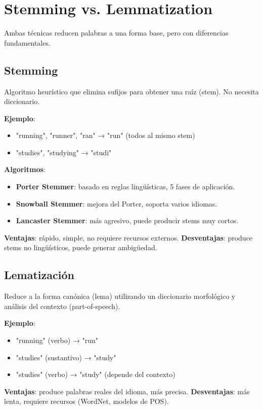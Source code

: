 \documentclass[12pt,a4paper,openany,oneside]{book}
\begin{document}
\section{Stemming vs. Lemmatization}

Ambas técnicas reducen palabras a una forma base, pero con diferencias fundamentales.

\subsection{Stemming}
Algoritmo heurístico que elimina sufijos para obtener una raíz (stem). No necesita diccionario.

\textbf{Ejemplo}:
\begin{itemize}
    \item "running", "runner", "ran" → "run" (todos al mismo stem)
    \item "studies", "studying" → "studi"
\end{itemize}

\textbf{Algoritmos}:
\begin{itemize}
    \item \textbf{Porter Stemmer}: basado en reglas lingüísticas, 5 fases de aplicación.
    \item \textbf{Snowball Stemmer}: mejora del Porter, soporta varios idiomas.
    \item \textbf{Lancaster Stemmer}: más agresivo, puede producir stems muy cortos.
\end{itemize}

\textbf{Ventajas}: rápido, simple, no requiere recursos externos.
\textbf{Desventajas}: produce stems no lingüísticos, puede generar ambigüedad.

\subsection{Lematización}
Reduce a la forma canónica (lema) utilizando un diccionario morfológico y análisis del contexto (part-of-speech).

\textbf{Ejemplo}:
\begin{itemize}
    \item "running" (verbo) → "run"
    \item "studies" (sustantivo) → "study"
    \item "studies" (verbo) → "study" (depende del contexto)
\end{itemize}

\textbf{Ventajas}: produce palabras reales del idioma, más precisa.
\textbf{Desventajas}: más lenta, requiere recursos (WordNet, modelos de POS).
\end{document}

